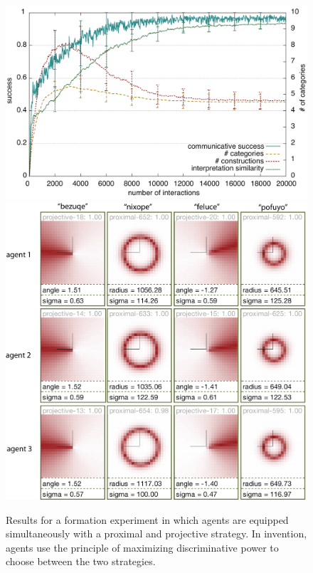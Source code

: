 \begin{figure}
\begin{center}
\includegraphics[width=0.8\columnwidth]{figs/category-formation-proximal+projective-results+categories-1}\\
\includegraphics[width=0.8\columnwidth]{figs/category-formation-proximal+projective-results+categories-2.png}
\end{center}
\caption[Results simultaneous formation of proximal and projective systems]{Results for a formation experiment in which agents are equipped simultaneously
with a proximal and projective strategy. In invention, agents use the principle of maximizing discriminative power
to choose between the two strategies.}
\label{f:category-formation-proximal+projective-results}
\end{figure}

